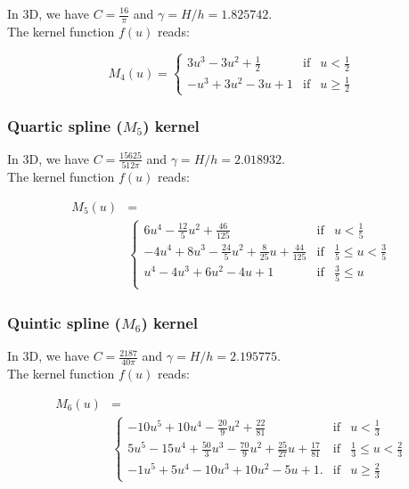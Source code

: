 \documentclass[fleqn, usenatbib, useAMS,a4paper]{mnras}
\begin{document}
In 3D, we have $C=\frac{16}{\pi}$ and $\gamma=H/h = 1.825742$.\\
The kernel function $f(u)$ reads:

\begin{equation}
  M_4(u) = \left\lbrace\begin{array}{rcl}
  3u^3 - 3u^2 + \frac{1}{2} & \mbox{if} & u<\frac{1}{2}\\
  -u^3 + 3u^2 - 3u + 1 & \mbox{if} & u \geq \frac{1}{2}
  \end{array}
  \right.
    \nonumber
\end{equation}


\subsubsection{Quartic spline ($M_5$) kernel}

In 3D, we have $C=\frac{15625}{512\pi}$ and $\gamma=H/h = 2.018932$.\\
The kernel function $f(u)$ reads:

\begin{align}
  M_5(u) &=     \nonumber\\
  &\left\lbrace\begin{array}{rcl}
  6u^4 - \frac{12}{5}u^2 + \frac{46}{125} & \mbox{if} & u < \frac{1}{5} \\
  -4u^4 + 8u^3  - \frac{24}{5}u^2 + \frac{8}{25}u + \frac{44}{125} &  \mbox{if} &  \frac{1}{5} \leq u < \frac{3}{5}\\
  u^4 - 4u^3 + 6u^2 - 4u + 1 &  \mbox{if} &  \frac{3}{5} \leq u \\
  \end{array}
  \right.
  \nonumber
\end{align}


\subsubsection{Quintic spline ($M_6$) kernel}

In 3D, we have $C=\frac{2187}{40\pi}$ and $\gamma=H/h = 2.195775$.\\
The kernel function $f(u)$ reads:

\begin{align}
  M_6(u) &=     \nonumber\\
  &\left\lbrace\begin{array}{rcl}
  -10u^5 + 10u^4 - \frac{20}{9}u^2 + \frac{22}{81} & \mbox{if} & u < \frac{1}{3} \\
  5u^5 - 15u^4 + \frac{50}{3}u^3 - \frac{70}{9}u^2 + \frac{25}{27}u + \frac{17}{81} &  \mbox{if} &  \frac{1}{3} \leq u < \frac{2}{3}\\
  -1u^5 + 5u^4 - 10u^3 + 10u^2 - 5u + 1. & \mbox{if} & u \geq \frac{2}{3}
  \end{array}
  \right.
      \nonumber
\end{align}
\end{document}
